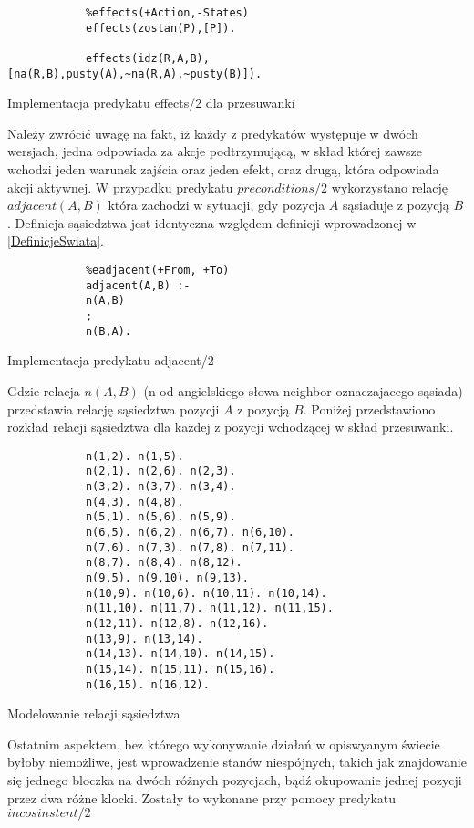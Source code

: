     \begin{listing}[H]
        \begin{verbatim}
            %effects(+Action,-States)
            effects(zostan(P),[P]).

            effects(idz(R,A,B), [na(R,B),pusty(A),~na(R,A),~pusty(B)]).
        \end{verbatim}
    \caption{Implementacja predykatu effects/2 dla przesuwanki}
    \end{listing}

    Należy zwrócić uwagę na fakt, iż każdy z predykatów występuje w dwóch wersjach, jedna odpowiada za akcje podtrzymującą, w skład której 
    zawsze wchodzi jeden warunek zajścia oraz jeden efekt, oraz drugą, która odpowiada akcji aktywnej. W przypadku predykatu $preconditions/2$
    wykorzystano relację $adjacent(A,B)$ która zachodzi w sytuacji, gdy pozycja $A$ sąsiaduje z pozycją $B$. Definicja sąsiedztwa jest identyczna 
    względem definicji wprowadzonej w \ref{DefinicjeSwiata}.

    \begin{listing}[H]
        \begin{verbatim}
            %eadjacent(+From, +To)
            adjacent(A,B) :-
            n(A,B)
            ;
            n(B,A).
        \end{verbatim}
    \caption{Implementacja predykatu adjacent/2}
    \end{listing}
    
    Gdzie relacja $n(A,B)$ (n od angielskiego słowa neighbor oznaczajacego sąsiada)
    przedstawia relację sąsiedztwa pozycji $A$ z pozycją $B$. Poniżej przedstawiono rozkład relacji 
    sąsiedztwa dla każdej z pozycji wchodzącej w skład przesuwanki.

    \begin{listing}[H]
        \begin{verbatim}
            n(1,2). n(1,5).
            n(2,1). n(2,6). n(2,3).
            n(3,2). n(3,7). n(3,4).
            n(4,3). n(4,8).
            n(5,1). n(5,6). n(5,9).
            n(6,5). n(6,2). n(6,7). n(6,10).
            n(7,6). n(7,3). n(7,8). n(7,11).
            n(8,7). n(8,4). n(8,12).
            n(9,5). n(9,10). n(9,13).
            n(10,9). n(10,6). n(10,11). n(10,14).
            n(11,10). n(11,7). n(11,12). n(11,15).
            n(12,11). n(12,8). n(12,16). 
            n(13,9). n(13,14).
            n(14,13). n(14,10). n(14,15).
            n(15,14). n(15,11). n(15,16).
            n(16,15). n(16,12).
        \end{verbatim}
    \caption{Modelowanie relacji sąsiedztwa}
    \end{listing}
    Ostatnim aspektem, bez którego wykonywanie działań w opiswyanym świecie byłoby niemożliwe, jest wprowadzenie stanów niespójnych, takich jak znajdowanie 
    się jednego bloczka na dwóch różnych pozycjach, bądź okupowanie jednej pozycji przez dwa różne klocki. Zostały to wykonane 
    przy pomocy predykatu $incosinstent/2$

